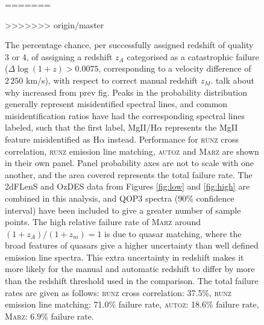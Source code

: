 \documentclass[iop]{emulateapj}
\newcommand{\red}{\color{red}}
\newcommand{\runz}{\textsc{runz}}
\newcommand{\autoz}{\textsc{autoz}}
\newcommand{\marz}{\textsc{Marz}}
\begin{document}
\begin{figure}[h]
=======
\caption{The percentage chance, per successfully assigned redshift of quality 3 or 4, of assigning a redshift $z_A$ categorised as a catastrophic failure ($\Delta \log(1 + z) > 0.0075$, corresponding to a velocity difference of $2\,250$ km/s), with respect to correct manual redshift $z_M$. {\red talk about why increased from prev fig}. Peaks in the probability distribution generally represent misidentified spectral lines, and common misidentification ratios have had the corresponding spectral lines labeled, such that the first label, MgII/H$\alpha$ represents the MgII feature misidentified as H$\alpha$ instead. Performance for \runz{} cross correlation, \runz{} emission line matching, \autoz{} and \marz{} are shown in their own panel. Panel probability axes are not to scale with one another, and the area covered represents the total failure rate. The 2dFLenS and OzDES data from Figures \ref{fig:low} and \ref{fig:high} are combined in this analysis, and QOP3 spectra (90\% confidence interval) have been included to give a greater number of sample points. The high relative failure rate of \marz{} around $(1+z_A)/(1+z_m) = 1$ is due to quasar matching, where the broad features of quasars give a higher uncertainty than well defined emission line spectra. This extra uncertainty in redshift makes it more likely for the manual and automatic redshift to differ by more than the redshift threshold used in the comparison. The total failure rates are given as follows: \runz{} cross correlation: 37.5\%, \runz{} emission line matching: 71.0\% failure rate, \autoz{}: 18.6\% failure rate, \marz{}: 6.9\% failure rate.}
>>>>>>> origin/master
\label{fig:f4}
\end{figure}
\end{document}
